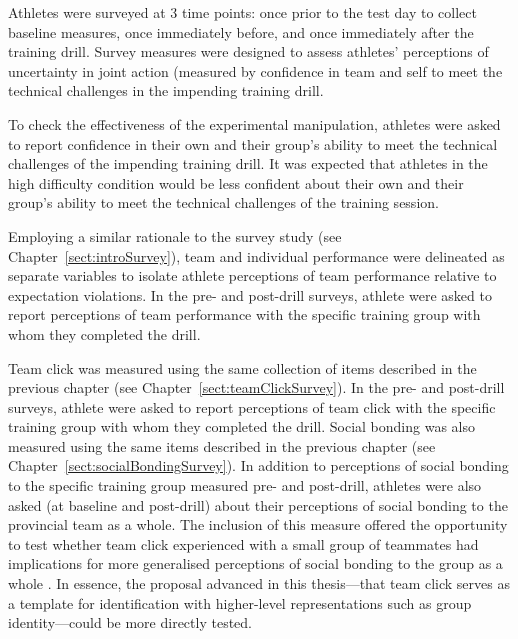 \begin{CJK}{UTF8}{gbsn}
Athletes were surveyed at 3 time points: once prior to the test day to collect baseline measures, once immediately before, and once immediately after the training drill.  Survey measures were designed to assess athletes’ perceptions of uncertainty in joint action (measured by confidence in team and self to meet the technical challenges in the impending training drill.

To check the effectiveness of the experimental manipulation, athletes were asked to report confidence in their own and their group's ability to meet the technical challenges of the impending training drill.  It was expected that athletes in the high difficulty condition would be less confident about their own and their group's ability to meet the technical challenges of the training session.

Employing a similar rationale to the survey study (see Chapter~\ref{sect:introSurvey}), team and individual performance were delineated as separate variables   to isolate athlete perceptions of team performance relative to expectation violations.  In the pre- and post-drill surveys, athlete were asked to report perceptions of team performance with the specific training group with whom they completed the drill.

Team click was measured using the same collection of items described in the previous chapter (see Chapter~\ref{sect:teamClickSurvey}).  In the pre- and post-drill surveys, athlete were asked to report perceptions of team click with the specific training group with whom they completed the drill.  Social bonding was also measured using the same items described in the previous chapter (see Chapter~\ref{sect:socialBondingSurvey}).  In addition to perceptions of social bonding to the specific training group measured pre- and post-drill, athletes were also asked (at baseline and post-drill) about their perceptions of social bonding to the provincial team as a whole.  The inclusion of this measure offered the opportunity to test whether team click experienced with a small group of teammates had implications for more generalised perceptions of social bonding to the group as a whole \citep[see, for example][]{Reddish2013a,Swann2010}.  In essence, the proposal advanced in this thesis---that team click serves as a template for identification with higher-level representations such as group identity---could be more directly tested.


\end{CJK}
